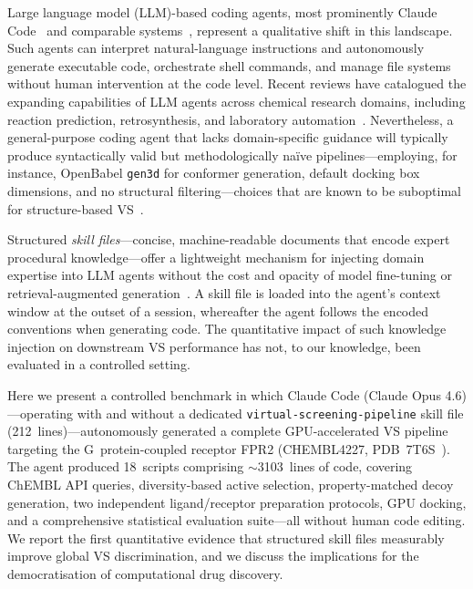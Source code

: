 \documentclass[10pt,a4paper,twocolumn]{article}
\newcommand{\NSCRIPTS}{18}
\newcommand{\NLINES}{3103}
\newcommand{\NSKILLLINES}{212}
\begin{document}
Large language model (LLM)-based coding agents, most prominently Claude Code~\citep{claudecode2024} and comparable systems~\citep{boiko2023,llm_drug2024}, represent a qualitative shift in this landscape. Such agents can interpret natural-language instructions and autonomously generate executable code, orchestrate shell commands, and manage file systems without human intervention at the code level. Recent reviews have catalogued the expanding capabilities of LLM agents across chemical research domains, including reaction prediction, retrosynthesis, and laboratory automation~\citep{ramos2025}. Nevertheless, a general-purpose coding agent that lacks domain-specific guidance will typically produce syntactically valid but methodologically na\"{i}ve pipelines---employing, for instance, OpenBabel \texttt{gen3d} for conformer generation, default docking box dimensions, and no structural filtering---choices that are known to be suboptimal for structure-based VS~\citep{huang2006,bedroc2007}.

Structured \textit{skill files}---concise, machine-readable documents that encode expert procedural knowledge---offer a lightweight mechanism for injecting domain expertise into LLM agents without the cost and opacity of model fine-tuning or retrieval-augmented generation~\citep{claudecode2024}. A skill file is loaded into the agent's context window at the outset of a session, whereafter the agent follows the encoded conventions when generating code. The quantitative impact of such knowledge injection on downstream VS performance has not, to our knowledge, been evaluated in a controlled setting.

Here we present a controlled benchmark in which Claude Code (Claude Opus 4.6)---operating with and without a dedicated \texttt{virtual-screening-pipeline} skill file (\NSKILLLINES{}~lines)---autonomously generated a complete GPU-accelerated VS pipeline targeting the G~protein-coupled receptor FPR2 (CHEMBL4227, PDB~7T6S~\citep{fpr2_2022,fpr2_structure2022}). The agent produced \NSCRIPTS{}~scripts comprising $\sim$\NLINES{}~lines of code, covering ChEMBL API queries, diversity-based active selection, property-matched decoy generation, two independent ligand/receptor preparation protocols, GPU docking, and a comprehensive statistical evaluation suite---all without human code editing. We report the first quantitative evidence that structured skill files measurably improve global VS discrimination, and we discuss the implications for the democratisation of computational drug discovery.
\end{document}
